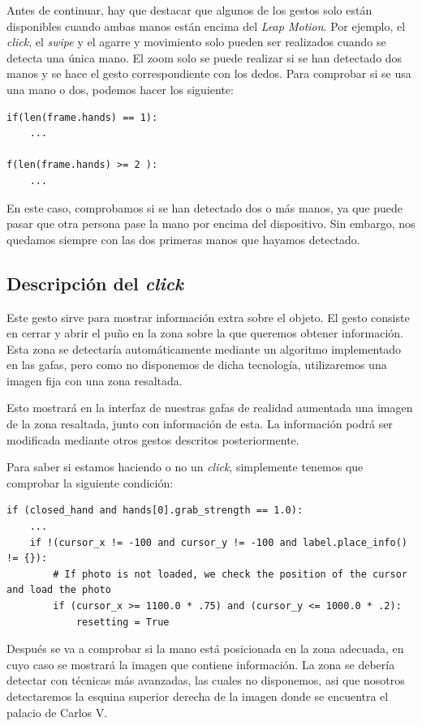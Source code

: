 \documentclass[11pt,a4paper]{article}
\begin{document}
Antes de continuar, hay que destacar que algunos de los gestos solo están disponibles cuando ambas manos están encima del \textit{Leap Motion}. Por ejemplo,
el \textit{click}, el \textit{swipe} y el agarre y movimiento solo pueden ser realizados cuando se detecta una única mano. El zoom solo se puede realizar si
se han detectado dos manos y se hace el gesto correspondiente con los dedos. Para comprobar si se usa una mano o dos, podemos hacer los siguiente:

\begin{lstlisting}
if(len(frame.hands) == 1):
	...

f(len(frame.hands) >= 2 ):
	...
\end{lstlisting}

En este caso, comprobamos si se han detectado dos o más manos, ya que puede pasar que otra persona pase la mano por encima del dispositivo. Sin embargo, nos
quedamos siempre con las dos primeras manos que hayamos detectado.

\subsection{Descripción del \textit{click}}

Este gesto sirve para mostrar información extra sobre el objeto. El gesto consiste en cerrar y abrir el puño en la zona sobre la que queremos obtener información.
Esta zona se detectaría automáticamente mediante un algoritmo implementado en las gafas, pero como no disponemos de dicha tecnología, utilizaremos una imagen fija
con una zona resaltada.

Esto mostrará en la interfaz de nuestras gafas de realidad aumentada una imagen de la zona resaltada, junto con información de esta. La información podrá ser modificada
mediante otros gestos descritos posteriormente.

Para saber si estamos haciendo o no un \textit{click}, simplemente tenemos que comprobar la siguiente condición:

\begin{lstlisting}
if (closed_hand and hands[0].grab_strength == 1.0):
	...
	if !(cursor_x != -100 and cursor_y != -100 and label.place_info() != {}):
		# If photo is not loaded, we check the position of the cursor and load the photo
        if (cursor_x >= 1100.0 * .75) and (cursor_y <= 1000.0 * .2):
            resetting = True
\end{lstlisting}

Después se va a comprobar si la mano está posicionada en la zona adecuada, en cuyo caso se mostrará la imagen que contiene información. La zona se
debería detectar con técnicas más avanzadas, las cuales no disponemos, asi que nosotros detectaremos la esquina superior derecha de la imagen donde
se encuentra el palacio de Carlos V.
\end{document}
